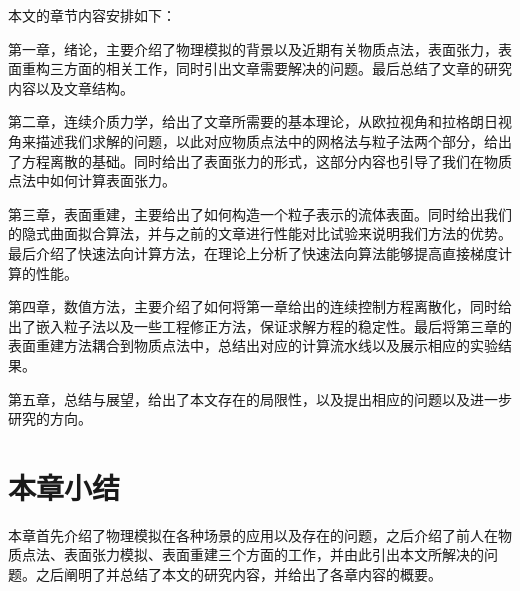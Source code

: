 本文的章节内容安排如下：

    第一章，绪论，主要介绍了物理模拟的背景以及近期有关物质点法，表面张力，表面重构三方面的相关工作，同时引出文章需要解决的问题。最后总结了文章的研究内容以及文章结构。

    第二章，连续介质力学，给出了文章所需要的基本理论，从欧拉视角和拉格朗日视角来描述我们求解的问题，以此对应物质点法中的网格法与粒子法两个部分，给出了方程离散的基础。同时给出了表面张力的形式，这部分内容也引导了我们在物质点法中如何计算表面张力。

    第三章，表面重建，主要给出了如何构造一个粒子表示的流体表面。同时给出我们的隐式曲面拟合算法，并与之前的文章进行性能对比试验来说明我们方法的优势。最后介绍了快速法向计算方法，在理论上分析了快速法向算法能够提高直接梯度计算的性能。

    第四章，数值方法，主要介绍了如何将第一章给出的连续控制方程离散化，同时给出了嵌入粒子法以及一些工程修正方法，保证求解方程的稳定性。最后将第三章的表面重建方法耦合到物质点法中，总结出对应的计算流水线以及展示相应的实验结果。

    第五章，总结与展望，给出了本文存在的局限性，以及提出相应的问题以及进一步研究的方向。
\section{本章小结}
本章首先介绍了物理模拟在各种场景的应用以及存在的问题，之后介绍了前人在物质点法、表面张力模拟、表面重建三个方面的工作，并由此引出本文所解决的问题。之后阐明了并总结了本文的研究内容，并给出了各章内容的概要。
